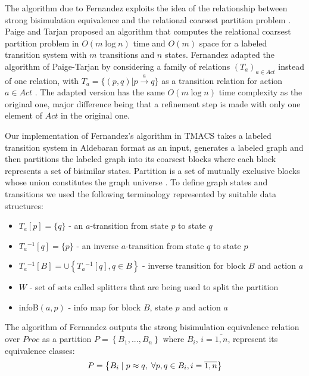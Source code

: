 The algorithm due to Fernandez exploits the idea of the relationship between strong bisimulation equivalence 
and the relational coarsest partition problem \cite{KanellakisSmolka}\cite{PaigeTarjan}. Paige and Tarjan \cite{PaigeTarjan} 
proposed an algorithm that computes the relational coarsest partition problem in $O(m \log n)$ time and $O(m)$ space for a labeled transition system with $m$ transitions and $n$ states. Fernandez adapted the algorithm of Paige-Tarjan by considering a family of relations $\left(T_a\right)_{a\in \mathit{Act}}$ instead of one relation, with $T_a=\{(p,q)|p\stackrel{a}{\rightarrow}q\}$ as a transition relation for action $a\in \mathit{Act}$ \cite{Fernandez}. The adapted version has the same $O(m \log n)$ time complexity as the original one, major difference being that a refinement step is made with only one element of $Act$ in the original one. 

Our implementation of Fernandez's algorithm in TMACS takes a labeled transition system in Aldebaran format as an input, generates a labeled graph and then partitions the labeled graph into its coarsest blocks where each block represents a set of bisimilar states. Partition is a set of mutually exclusive blocks whose union constitutes the graph universe \cite{Fernandez}. To define graph states 
and transitions we used the following terminology represented by suitable data structures: 
\begin{itemize}
	\item $T_a[p]=\{q\}$ - an $a$-transition from state $p$ to state $q$
	\item $T_a{}^{-1}[q]=\{p\}$ - an inverse $a$-transition from state $q$ to state $p$
	\item $T_a{}^{-1}[B]=\cup \left\{T_a{}^{-1}[q],q\in B\right\}$ - inverse transition for block $B$ and action $a$
	\item $W$ - set of sets called splitters that are being used to split the partition
	\item infoB$(a, p)$ - info map for block $B$, state $p$ and action $a$
\end{itemize}

The algorithm of Fernandez outputs the strong bisimulation equivalence relation over $\mathit{Proc}$ as a partition $P=\left\{B_{1},...,B_{n}\right\}$ where $B_{i}$, $i=\overline{1,n}$, represent its equivalence classes:
\begin{equation*}
	P = \left\{B_{i}\hspace{1mm}|\hspace{1mm} p\approx q,\hspace{1mm} \forall p,q\in B_{i}, i=\overline{1,n} \right\}
\end{equation*}

